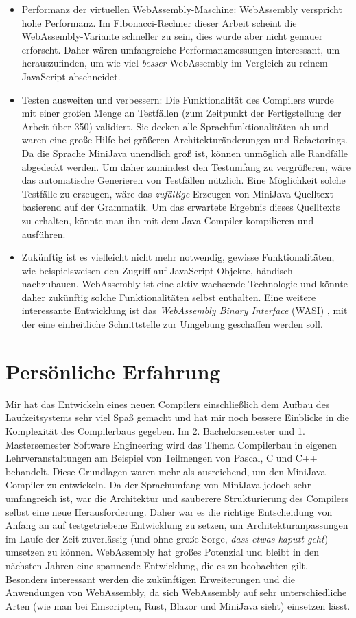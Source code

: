 \begin{itemize}
    \item Performanz der virtuellen WebAssembly-Maschine: WebAssembly verspricht hohe Performanz. Im Fibonacci-Rechner dieser Arbeit scheint die WebAssembly-Variante schneller zu sein, dies wurde aber nicht genauer erforscht. Daher wären umfangreiche Performanzmessungen interessant, um herauszufinden, um wie viel \emph{besser} WebAssembly im Vergleich zu reinem JavaScript abschneidet.
    \item Testen ausweiten und verbessern: Die Funktionalität des Compilers wurde mit einer großen Menge an Testfällen (zum Zeitpunkt der Fertigstellung der Arbeit über 350) validiert. Sie decken alle Sprachfunktionalitäten ab und waren eine große Hilfe bei größeren Architekturänderungen und Refactorings. Da die Sprache MiniJava unendlich groß ist, können unmöglich alle Randfälle abgedeckt werden. Um daher zumindest den Testumfang zu vergrößeren, wäre das automatische Generieren von Testfällen nützlich. Eine Möglichkeit solche Testfälle zu erzeugen, wäre das \emph{zufällige} Erzeugen von MiniJava-Quelltext basierend auf der Grammatik. Um das erwartete Ergebnis dieses Quelltexts zu erhalten, könnte man ihn mit dem Java-Compiler kompilieren und ausführen.
    \item Zukünftig ist es vielleicht nicht mehr notwendig, gewisse Funktionalitäten, wie beispielsweisen den Zugriff auf JavaScript-Objekte, händisch nachzubauen. WebAssembly ist eine aktiv wachsende Technologie und könnte daher zukünftig solche Funktionalitäten selbst enthalten. Eine weitere interessante Entwicklung ist das \emph{WebAssembly Binary Interface} (WASI) \cite{WASI}, mit der eine einheitliche Schnittstelle zur Umgebung geschaffen werden soll.
\end{itemize}

\section{Persönliche Erfahrung}

Mir hat das Entwickeln eines neuen Compilers einschließlich dem Aufbau des Laufzeitsystems sehr viel Spaß gemacht und hat mir noch bessere Einblicke in die Komplexität des Compilerbaus gegeben. Im 2. Bachelorsemester und 1. Mastersemester Software Engineering wird das Thema Compilerbau in eigenen Lehrveranstaltungen am Beispiel von Teilmengen von Pascal, C und C++ behandelt. Diese Grundlagen waren mehr als ausreichend, um den MiniJava-Compiler zu entwickeln. Da der Sprachumfang von MiniJava jedoch sehr umfangreich ist, war die Architektur und sauberere Strukturierung des Compilers selbst eine neue Herausforderung. Daher war es die richtige Entscheidung von Anfang an auf testgetriebene Entwicklung zu setzen, um Architekturanpassungen im Laufe der Zeit zuverlässig (und ohne große Sorge, \emph{dass etwas kaputt geht}) umsetzen zu können. WebAssembly hat großes Potenzial und bleibt in den nächsten Jahren eine spannende Entwicklung, die es zu beobachten gilt. Besonders interessant werden die zukünftigen Erweiterungen und die Anwendungen von WebAssembly, da sich WebAssembly auf sehr unterschiedliche Arten (wie man bei Emscripten, Rust, Blazor und MiniJava sieht) einsetzen lässt.
